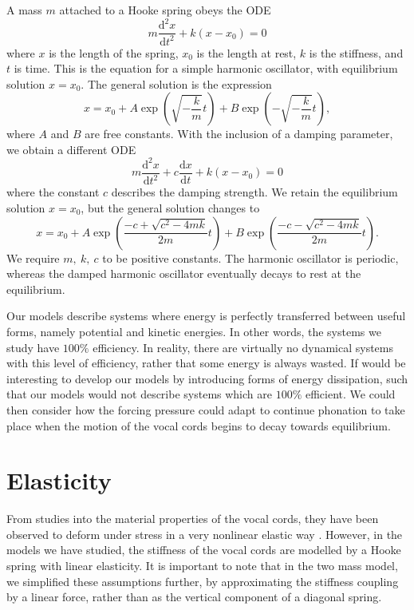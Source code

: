 \documentclass{report}
\begin{document}
A mass $m$ attached to a Hooke spring obeys the ODE
\begin{equation*}
	m\frac{\mathrm{d}^2 x}{\mathrm{d}t^2} + k(x-x_0) = 0
\end{equation*}
where $x$ is the length of the spring, $x_0$ is the length at rest,
$k$ is the stiffness,
and $t$ is time.
This is the equation for a simple harmonic oscillator,
with equilibrium solution $x=x_0$.
The general solution is the expression
\begin{equation*}
	x = x_0 + A\exp \left(
		\sqrt{-\frac{k}{m}}t
	\right) + B\exp \left(
		-\sqrt{-\frac{k}{m}}t
	\right),
\end{equation*}
where $A$ and $B$ are free constants.
With the inclusion of a damping parameter,
we obtain a different ODE
\begin{equation*}
	m\frac{\mathrm{d}^2 x}{\mathrm{d}t^2} + c\frac{\mathrm{d}x}{\mathrm{d}t} + k(x-x_0) = 0
\end{equation*}
where the constant $c$ describes the damping strength.
We retain the equilibrium solution $x=x_0$, but the general solution changes to
\begin{equation*}
	x = x_0 + A \exp \left(
		\frac{-c+\sqrt{c^2-4mk}}{2m}t
	\right) + B \exp \left(
		\frac{-c-\sqrt{c^2-4mk}}{2m}t
	\right).
\end{equation*}
We require $m,~k,~c$ to be positive constants.
The harmonic oscillator is periodic,
whereas the damped harmonic oscillator eventually decays to rest at the equilibrium.

Our models describe systems where energy is perfectly transferred between useful forms,
namely potential and kinetic energies.
In other words, the systems we study have $100\%$ efficiency.
In reality, there are virtually no dynamical systems with this level of efficiency,
rather that some energy is always wasted.
If would be interesting to develop our models by introducing forms of energy dissipation,
such that our models would not describe systems which are $100\%$ efficient.
We could then consider how the forcing pressure could adapt to continue phonation to take place when the motion of the vocal cords begins to decay towards equilibrium.


\section{Elasticity}

From studies into the material properties of the vocal cords,
they have been observed to deform under stress in a very nonlinear elastic way \cite{alipour_2012}.
However, in the models we have studied,
the stiffness of the vocal cords are modelled by a Hooke spring with linear elasticity.
It is important to note that in the two mass model,
we simplified these assumptions further,
by approximating the stiffness coupling by a linear force,
rather than as the vertical component of a diagonal spring.
\end{document}
